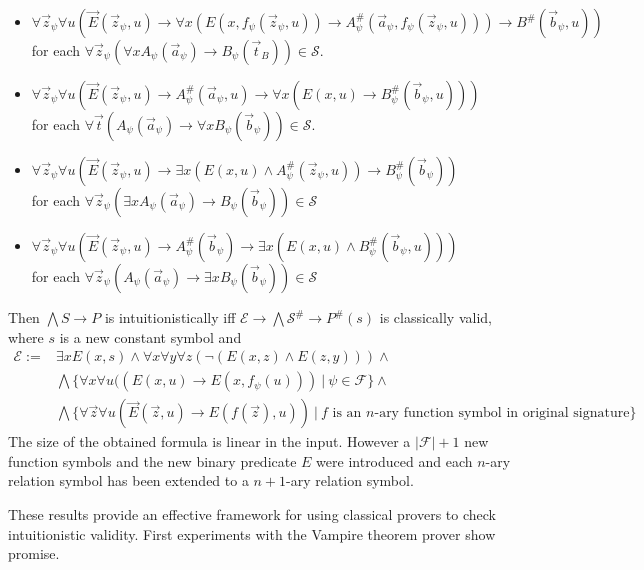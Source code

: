 \documentclass[a4paper,UKenglish,cleveref, autoref, thm-restate]{lipics-v2021}
\begin{document}
\begin{theorem}
\begin{itemize}
		\item  $\forall \vec z_\psi\forall u(\vec E(\vec z_\psi, u)\to \forall x(E(x, f_\psi(\vec z_\psi, u))\to A_\psi^\#(\vec a_\psi, f_\psi(\vec z_\psi, u)))\to B^\#(\vec b_\psi, u))$\\for each $\forall \vec z_\psi(\forall xA_\psi(\vec a_\psi)\to B_\psi(\vec t_B))\in\mathcal S$.
		\item $\forall \vec z_\psi\forall u(\vec E(\vec z_\psi, u)\to A^\#_\psi(\vec a_\psi, u)\to \forall x(E(x, u)\to B^\#_\psi(\vec b_\psi, u)))$\\for each $\forall \vec t(A_\psi(\vec a_\psi)\to \forall xB_\psi(\vec b_\psi))\in\mathcal S$.
		\item $\forall \vec z_\psi\forall u(\vec E(\vec z_\psi, u)\to \exists x(E(x, u)\wedge A^\#_\psi(\vec z_\psi, u))\to B^\#_\psi(\vec b_\psi))$\\for each $\forall \vec z_\psi(\exists xA_\psi(\vec a_\psi)\to B_\psi(\vec b_\psi))\in\mathcal S$
		\item $\forall \vec z_\psi\forall u(\vec E(\vec z_\psi, u)\to A^\#_\psi(\vec b_\psi)\to \exists x(E(x, u)\wedge B^\#_\psi(\vec b_\psi, u)))$\\for each $\forall \vec z_\psi(A_\psi(\vec a_\psi)\to \exists xB_\psi(\vec b_\psi))\in\mathcal S$
	\end{itemize}
	Then $\bigwedge S\to P$ is intuitionistically iff $\mathcal E\to \bigwedge\mathcal S^\#\to P^\#(s)$ is classically valid, where $s$ is a new constant symbol and
	\begin{align*}
		\mathcal E := &\exists xE(x, s)\wedge \forall x\forall y\forall z(\neg(E(x, z)\wedge E(z, y)))\wedge\\
		& \bigwedge\{\forall x\forall u((E(x, u)\to E(x, f_\psi(u)))\:|\:\psi\in\mathcal F\}\wedge\\
		& \bigwedge\{\forall\vec z\forall u(\vec E(\vec z, u)\to E(f(\vec z), u))\:|\:\text{$f$ is an $n$-ary function symbol in original signature}\}
	\end{align*}
	The size of the obtained formula is linear in the input. However a $|\mathcal F| + 1$ new function symbols and the new binary predicate $E$ were introduced and each $n$-ary relation symbol has been extended to a $n+1$-ary relation symbol.
\end{theorem}

These results provide an effective framework for using classical provers to check intuitionistic validity. First experiments with the Vampire theorem prover show promise.
\end{document}
